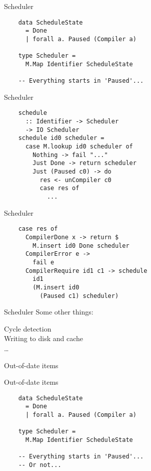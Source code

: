 \documentclass[20pt]{beamer}
\newcommand{\vspaced}{
    \vspace{5mm}
}
\newcommand{\chapterslide}[1]{
    {
        \begin{frame}[plain]
        \begin{center}
        \large{#1}
        \end{center}
        \end{frame}
    }
}
\begin{document}
\begin{frame}[fragile]{Scheduler}
    \begin{lstlisting}
    data ScheduleState
      = Done
      | forall a. Paused (Compiler a)

    type Scheduler =
      M.Map Identifier ScheduleState

    -- Everything starts in 'Paused'...

    \end{lstlisting}
\end{frame}

\begin{frame}[fragile]{Scheduler}
    \begin{lstlisting}
    schedule
      :: Identifier -> Scheduler
      -> IO Scheduler
    schedule id0 scheduler =
      case M.lookup id0 scheduler of
        Nothing -> fail "..."
        Just Done -> return scheduler
        Just (Paused c0) -> do
          res <- unCompiler c0
          case res of
            ...
    \end{lstlisting}
\end{frame}

\begin{frame}[fragile]{Scheduler}
    \begin{lstlisting}
    case res of
      CompilerDone x -> return $
        M.insert id0 Done scheduler
      CompilerError e ->
        fail e
      CompilerRequire id1 c1 -> schedule
        id1
        (M.insert id0
          (Paused c1) scheduler)
    \end{lstlisting}
\end{frame}

\begin{frame}{Scheduler}
    Some other things: \\
    \vspaced
    Cycle detection \\
    Writing to disk and cache \\
    \ldots
\end{frame}

\chapterslide{Out-of-date items}

\begin{frame}[fragile]{Out-of-date items}
    \begin{lstlisting}
    data ScheduleState
      = Done
      | forall a. Paused (Compiler a)

    type Scheduler =
      M.Map Identifier ScheduleState

    -- Everything starts in 'Paused'...
    -- Or not...
    \end{lstlisting}
\end{frame}
\end{document}
